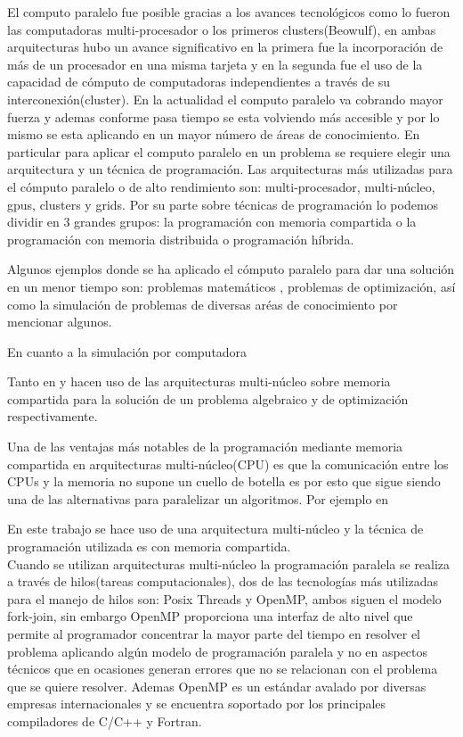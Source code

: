El computo paralelo fue posible gracias a los avances tecnológicos como lo fueron las computadoras multi-procesador o los primeros clusters(Beowulf), en ambas arquitecturas hubo un avance significativo en la primera fue la incorporación de más de un procesador en una misma tarjeta y en la segunda fue el uso de la capacidad de cómputo de computadoras independientes a través de su interconexión(cluster). En la actualidad el computo paralelo va cobrando mayor fuerza y ademas conforme pasa tiempo se esta volviendo más accesible y por lo mismo se esta aplicando en un mayor número de áreas de conocimiento. En particular para aplicar el computo paralelo en un problema se requiere elegir una arquitectura y un técnica de programación. Las arquitecturas más utilizadas para el cómputo paralelo o de alto rendimiento son: multi-procesador, multi-núcleo, gpus, clusters y grids. Por su parte sobre técnicas de programación lo podemos dividir en 3 grandes grupos: la programación con memoria compartida o la programación con memoria distribuida o programación híbrida. 



Algunos ejemplos donde se ha aplicado el cómputo paralelo para dar una solución en un menor tiempo son: problemas matemáticos , problemas de optimización, así como la simulación de problemas de diversas aréas de conocimiento por mencionar algunos. 


En cuanto a la simulación por computadora

%

Tanto en \cite{mchybrid} y \cite{mcmulticore} hacen uso de las arquitecturas multi-núcleo sobre memoria compartida para la solución de un problema algebraico y de optimización respectivamente.


Una de las ventajas más notables de la programación mediante memoria compartida en arquitecturas multi-núcleo(CPU) es que la comunicación entre los CPUs y la memoria no supone un cuello de botella es por esto que sigue siendo una de las alternativas para paralelizar un algoritmos. Por ejemplo en 


En este trabajo se hace uso de una arquitectura multi-núcleo y la técnica de programación utilizada es con memoria compartida.\\


Cuando se utilizan arquitecturas multi-núcleo la programación paralela se realiza a través de hilos(tareas computacionales), dos de las tecnologías más utilizadas para el manejo de hilos son: Posix Threads\cite{ref13} y OpenMP\cite{ref6}, ambos siguen el modelo fork-join, sin embargo OpenMP proporciona una interfaz de alto nivel que permite al programador concentrar la mayor parte del tiempo en resolver el problema aplicando algún modelo de programación paralela y no en aspectos técnicos que en ocasiones generan errores que no se relacionan con el problema que se quiere resolver. Ademas OpenMP es un estándar avalado por diversas empresas internacionales y se encuentra soportado por los principales compiladores de C/C++ y Fortran.\\

